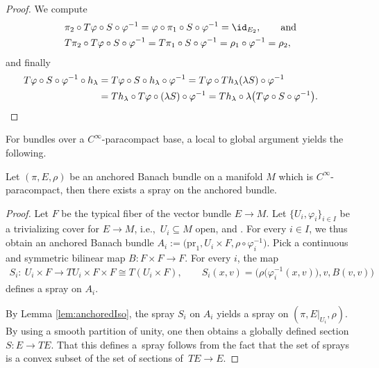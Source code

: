 \begin{proof}
 We compute
 \begin{align*}
 &\pi_{2} \circ T\varphi \circ S \circ \varphi^{-1}= \varphi \circ \pi_{1} \circ S \circ \varphi^{-1} = \id_{E_{2}}, \qquad\text{and}\\
 &T\pi_{2} \circ T\varphi \circ S \circ \varphi^{-1}= T\pi_{1} \circ S \circ \varphi^{-1} = \rho_{1} \circ \varphi^{-1} = \rho_{2},
 \end{align*}
 and finally
 \begin{align*}
 T\varphi \circ S \circ \varphi^{-1} \circ h_{\lambda} &{}= T\varphi \circ S \circ h_{\lambda} \circ \varphi^{-1} = T \varphi \circ Th_{\lambda} (\lambda S) \circ \varphi^{-1} \\
 &{}= Th_{\lambda} \circ T\varphi \circ (\lambda S) \circ \varphi^{-1} = Th_{\lambda} \circ \lambda\bigl(T\varphi \circ S \circ \varphi^{-1}\bigr). \qedhere
\tag*{\qed}
\end{align*}
\renewcommand{\qed}{}
\end{proof}

For bundles over a $C^\infty$-paracompact base, a local to global argument yields the following.

\begin{Lemma}\label{lem:ex_spray_anchor}
Let $(\pi,E,\rho)$ be an anchored Banach bundle on a manifold $M$ which is $C^\infty$-paracompact, then there exists a spray on the anchored bundle.
\end{Lemma}

\begin{proof}
 Let $F$ be the typical fiber of the vector bundle $E \rightarrow M$.
 Let $\{U_{i}, \varphi_{i}\}_{i\in I}$ be a trivializing cover for $E \rightarrow M$, i.e.,~$U_{i} \subseteq M$ open, and .
 For every $i\in I$, we thus obtain an anchored Banach bundle $A_{i} := \bigl(\mathrm{pr}_{1},U_{i} \times F, \rho \circ \varphi_{i}^{-1}\bigr)$.
 Pick a continuous and symmetric bilinear map $B\colon F \times F \rightarrow F$.
 For every $i$, the map
 \begin{align*}
 S_{i}\colon\ U_{i} \times F \rightarrow TU_{i} \times F \times F \cong T(U_{i} \times F), \qquad
 S_i(x,v) = \bigl(\rho \bigl(\varphi_{i}^{-1}(x,v)\bigr),v,B(v,v)\bigr)
 \end{align*}
 defines a spray on $A_{i}$.

 By Lemma \ref{lem:anchoredIso}, the spray $S_{i}$ on $A_{i}$ yields a spray on $(\pi, E|_{U_{i}},\rho)$.
 By using a smooth partition of unity, one then obtains a globally defined section $S\colon E \rightarrow TE$.
 That this defines a~spray follows from the fact that the set of sprays is a convex subset of the set of sections of~${TE \rightarrow E}$.
\end{proof}


